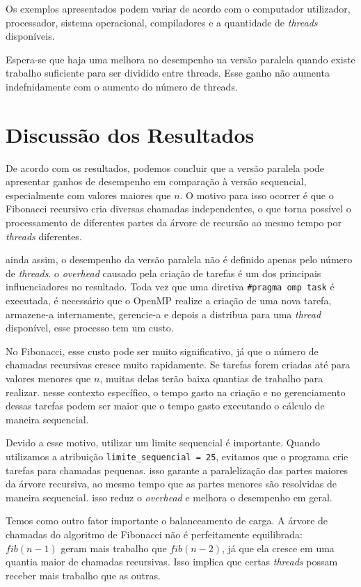 \documentclass[
    12pt,
    oneside,
    a4paper,
    brazil
]{abntex2}
\begin{document}
Os exemplos apresentados podem variar de acordo com o computador utilizador, processador, sistema operacional, compiladores e a quantidade de \textit{threads} disponíveis.

Espera-se que haja uma melhora no desempenho na versão paralela quando existe trabalho suficiente para ser dividido entre threads. Esse ganho não aumenta indefnidamente com o aumento do número de threads.

\chapter{Discussão dos Resultados}

De acordo com os resultados, podemos concluir que a versão paralela pode apresentar ganhos de desempenho em comparação à versão sequencial, especialmente com valores maiores que $n$. O motivo para isso ocorrer é que o Fibonacci recursivo cria diversas chamadas independentes, o que torna possível o processamento de diferentes partes da árvore de recursão ao mesmo tempo por \textit{threads} diferentes.

ainda assim, o desempenho da versão paralela não é definido apenas pelo número de \textit{threads}. o \textit{overhead} causado pela criação de tarefas é um dos principais influenciadores no resultado. Toda vez que uma diretiva \texttt{\#pragma omp task} é executada, é necessário que o OpenMP realize a criação de uma nova tarefa, armazene-a internamente, gerencie-a e depois a distribua para uma \textit{thread} disponível, esse processo tem um custo.

No Fibonacci, esse custo pode ser muito significativo, já que o número de chamadas recursivas cresce muito rapidamente. Se tarefas forem criadas até para valores menores que $n$, muitas delas terão baixa quantias de trabalho para realizar. nesse contexto específico, o tempo gasto na criação e no gerenciamento dessas tarefas podem ser maior que o tempo gasto executando o cálculo de maneira sequencial.

Devido a esse motivo, utilizar um limite sequencial é importante. Quando utilizamos a atribuição \texttt{limite\_sequencial = 25}, evitamos que o programa crie tarefas para chamadas pequenas. isso garante a paralelização das partes maiores da árvore recursiva, ao mesmo tempo que as partes menores são resolvidas de maneira sequencial. isso reduz o \textit{overhead} e melhora o desempenho em geral.

Temos como outro fator importante o balanceamento de carga. A árvore de chamadas do algoritmo de Fibonacci não é perfeitamente equilibrada: $fib(n - 1)$ geram mais trabalho que $fib(n - 2)$, já que ela cresce em uma quantia maior de chamadas recursivas. Isso implica que certas \textit{threads} possam receber mais trabalho que as outras.
\end{document}
